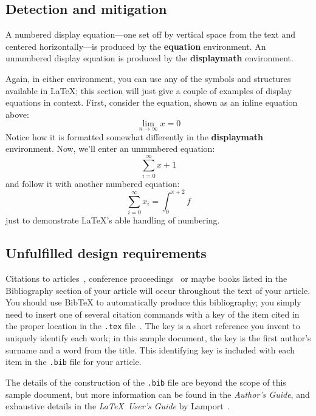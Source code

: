 \subsection{Detection and mitigation}
A numbered display equation---one set off by vertical space from the
text and centered horizontally---is produced by the \textbf{equation}
environment. An unnumbered display equation is produced by the
\textbf{displaymath} environment.

Again, in either environment, you can use any of the symbols
and structures available in \LaTeX\@; this section will just
give a couple of examples of display equations in context.
First, consider the equation, shown as an inline equation above:
\begin{equation}
  \lim_{n\rightarrow \infty}x=0
\end{equation}
Notice how it is formatted somewhat differently in
the \textbf{displaymath}
environment.  Now, we'll enter an unnumbered equation:
\begin{displaymath}
  \sum_{i=0}^{\infty} x + 1
\end{displaymath}
and follow it with another numbered equation:
\begin{equation}
  \sum_{i=0}^{\infty}x_i=\int_{0}^{\pi+2} f
\end{equation}
just to demonstrate \LaTeX's able handling of numbering.

\subsection{Unfulfilled design requirements}
Citations to articles~\cite{bowman:reasoning,
clark:pct, braams:babel, herlihy:methodology},
conference proceedings~\cite{clark:pct} or maybe
books \cite{Lamport:LaTeX, salas:calculus} listed
in the Bibliography section of your
article will occur throughout the text of your article.
You should use BibTeX to automatically produce this bibliography;
you simply need to insert one of several citation commands with
a key of the item cited in the proper location in
the \texttt{.tex} file~\cite{Lamport:LaTeX}.
The key is a short reference you invent to uniquely
identify each work; in this sample document, the key is
the first author's surname and a
word from the title.  This identifying key is included
with each item in the \texttt{.bib} file for your article.

The details of the construction of the \texttt{.bib} file
are beyond the scope of this sample document, but more
information can be found in the \textit{Author's Guide},
and exhaustive details in the \textit{\LaTeX\ User's
Guide} by Lamport~.


